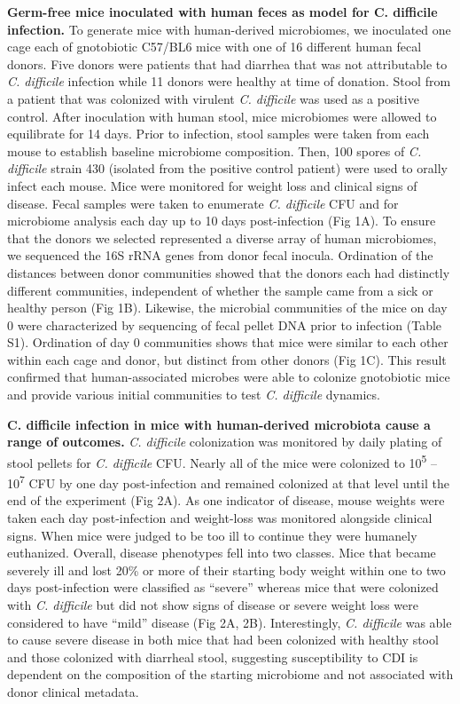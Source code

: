 \documentclass[11pt,]{article}
\begin{document}
\textbf{Germ-free mice inoculated with human feces as model for C.
difficile infection.} To generate mice with human-derived microbiomes,
we inoculated one cage each of gnotobiotic C57/BL6 mice with one of 16
different human fecal donors. Five donors were patients that had
diarrhea that was not attributable to \emph{C. difficile} infection
while 11 donors were healthy at time of donation. Stool from a patient
that was colonized with virulent \emph{C. difficile} was used as a
positive control. After inoculation with human stool, mice microbiomes
were allowed to equilibrate for 14 days. Prior to infection, stool
samples were taken from each mouse to establish baseline microbiome
composition. Then, 100 spores of \emph{C. difficile} strain 430
(isolated from the positive control patient) were used to orally infect
each mouse. Mice were monitored for weight loss and clinical signs of
disease. Fecal samples were taken to enumerate \emph{C. difficile} CFU
and for microbiome analysis each day up to 10 days post-infection (Fig
1A). To ensure that the donors we selected represented a diverse array
of human microbiomes, we sequenced the 16S rRNA genes from donor fecal
inocula. Ordination of the distances between donor communities showed
that the donors each had distinctly different communities, independent
of whether the sample came from a sick or healthy person (Fig 1B).
Likewise, the microbial communities of the mice on day 0 were
characterized by sequencing of fecal pellet DNA prior to infection
(Table S1). Ordination of day 0 communities shows that mice were similar
to each other within each cage and donor, but distinct from other donors
(Fig 1C). This result confirmed that human-associated microbes were able
to colonize gnotobiotic mice and provide various initial communities to
test \emph{C. difficile} dynamics.

\textbf{C. difficile infection in mice with human-derived microbiota
cause a range of outcomes.} \emph{C. difficile} colonization was
monitored by daily plating of stool pellets for \emph{C. difficile} CFU.
Nearly all of the mice were colonized to 10\textsuperscript{5} --
10\textsuperscript{7} CFU by one day post-infection and remained
colonized at that level until the end of the experiment (Fig 2A). As one
indicator of disease, mouse weights were taken each day post-infection
and weight-loss was monitored alongside clinical signs. When mice were
judged to be too ill to continue they were humanely euthanized. Overall,
disease phenotypes fell into two classes. Mice that became severely ill
and lost 20\% or more of their starting body weight within one to two
days post-infection were classified as ``severe'' whereas mice that were
colonized with \emph{C. difficile} but did not show signs of disease or
severe weight loss were considered to have ``mild'' disease (Fig 2A,
2B). Interestingly, \emph{C. difficile} was able to cause severe disease
in both mice that had been colonized with healthy stool and those
colonized with diarrheal stool, suggesting susceptibility to CDI is
dependent on the composition of the starting microbiome and not
associated with donor clinical metadata.
\end{document}
